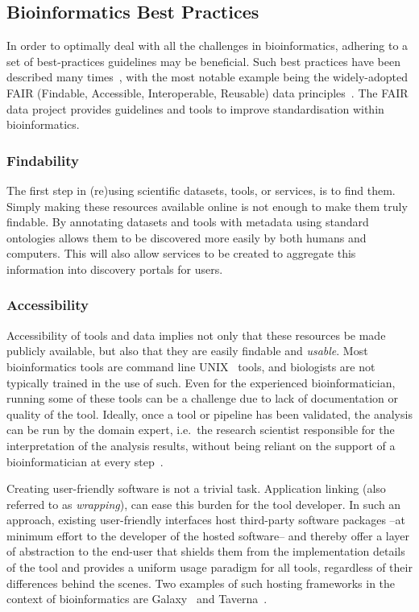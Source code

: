 \begin{justify}
\section{Bioinformatics Best Practices}

In order to optimally deal with all the challenges in bioinformatics, adhering to a set of best-practices guidelines may be beneficial. Such best practices have been described many times~\cite{sandve2013ten,Seemann2013,wilson2014best,prlic2012ten,altschul2013anatomy,via2013best,Leprevost2014}, with the most notable example being the widely-adopted FAIR (Findable, Accessible, Interoperable, Reusable) data principles~\cite{wilkinson2016fair}. The FAIR data project provides guidelines and tools to improve standardisation within bioinformatics.

\subsubsection{Findability}
The first step in (re)using scientific datasets, tools, or services, is to find them. Simply making these resources available online is not enough to make them truly findable. By annotating datasets and tools with metadata using standard ontologies allows them to be discovered more easily by both humans and computers. This will also allow services to be created to aggregate this information into discovery portals for users.


\subsubsection{Accessibility}
Accessibility of tools and data implies not only that these resources be made publicly available, but also that they are easily findable and \emph{usable}. Most bioinformatics tools are command line UNIX~\cite{url-unix} tools, and biologists are not typically trained in the use of such. Even for the experienced bioinformatician, running some of these tools can be a challenge due to lack of documentation or quality of the tool. Ideally, once a tool or pipeline has been validated, the analysis can be run by the domain expert, i.e.\ the research scientist responsible for the interpretation of the analysis results, without being reliant on the support of a bioinformatician at every step~\cite{kumar2007bioinformatics}.

Creating user-friendly software is not a trivial task. Application linking (also referred to as \emph{wrapping}), can ease this burden for the tool developer. In such an approach, existing user-friendly interfaces host third-party software packages --at minimum effort to the developer of the hosted software-- and thereby offer a layer of abstraction to the end-user that shields them from the implementation details of the tool and provides a uniform usage paradigm for all tools, regardless of their differences behind the scenes. Two examples of such hosting frameworks in the context of bioinformatics are Galaxy~\cite{giardine2005galaxy,goecks2010galaxy} and Taverna~\cite{oinn2004taverna}.


\end{justify}
